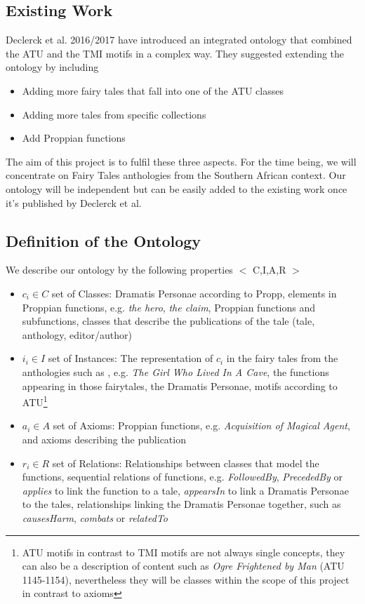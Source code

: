 \documentclass[10pt,a4paper]{article}
\begin{document}
	\subsection{Existing Work} 
	Declerck et al. 2016/2017 \cite{Declerck2017} have introduced an integrated ontology that combined the ATU and the TMI motifs in a complex way. They suggested extending the ontology by including 
	
	\begin{itemize}
		\item Adding more fairy tales that fall into one of the ATU classes
		\item Adding more tales from specific collections
		\item Add Proppian functions
		
	\end{itemize}	  
	
	The aim of this project is to fulfil these three aspects. For the time being, we will concentrate on Fairy Tales anthologies from the Southern African context. Our ontology will be independent but can be easily added to the existing work once it's published by Declerck et al.\cite{Declerck2017} 
	\subsection{Definition of the Ontology}
	We describe our ontology by the following properties $<$ C,I,A,R $>$

\begin{itemize}
	
	\item $c_{i} \in C $ set of Classes: Dramatis Personae according to Propp, elements in Proppian functions, e.g. \textit{the hero}, \textit{the claim}, Proppian functions and subfunctions, classes that describe the publications of the tale (tale, anthology, editor/author)       
	\item $i_{i} \in I $ set of Instances: The representation of $c_{i}$ in the fairy tales from the anthologies such as \cite{Smith1989}, e.g. \textit{The Girl Who Lived In A Cave}, the functions appearing in those fairytales, the Dramatis Personae,  motifs according to ATU\footnote{ATU motifs in contrast to TMI motifs are not always single concepts, they can also be a description of content such as \textit{Ogre Frightened by Man} (ATU 1145-1154), nevertheless they will be classes within the scope of this project in contrast to axioms} 
	\item $a_{i} \in A$  set of Axioms: Proppian functions, e.g. \textit{Acquisition of Magical Agent}, and axioms describing the publication 
	\item $r_{i} \in R $ set of Relations: Relationships between classes that model the functions, sequential relations of functions, e.g. \textit{FollowedBy}, \textit{PrecededBy} or \textit{applies} to link the function to a tale, \textit{appearsIn} to link a Dramatis Personae to the tales, relationships linking the Dramatis Personae together, such as \textit{causesHarm}, \textit{combats} or \textit{relatedTo}
	 
\end{itemize}
\end{document}
